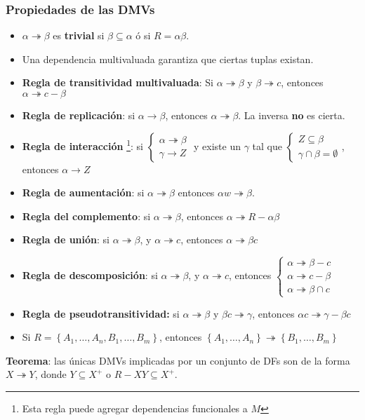 \documentclass[a4paper, twoside]{article}
\begin{document}
\subsubsection{Propiedades de las DMVs}
\begin{itemize}
\item $\alpha\twoheadrightarrow\beta$ es \textbf{trivial} si $\beta\subseteq\alpha$
ó si $R=\alpha\beta$.
\item Una dependencia multivaluada garantiza que ciertas tuplas existan.
\item \textbf{Regla de transitividad} \textbf{multivaluada}: Si $\alpha\twoheadrightarrow\beta$
y $\beta\twoheadrightarrow c$, entonces $\alpha\twoheadrightarrow c-\beta$
\item \textbf{Regla de replicación}: si $\alpha\to\beta$, entonces $\alpha\twoheadrightarrow\beta$.
La inversa \textbf{no} es cierta.
\item \textbf{Regla de interacción}%
\footnote{Esta regla puede agregar dependencias funcionales a $M$%
}: si $\begin{cases}
\alpha\twoheadrightarrow\beta\\
\gamma\to Z
\end{cases}$ y existe un $\gamma$ tal que $\begin{cases}
Z\subseteq\beta\\
\gamma\cap\beta=\emptyset
\end{cases}$, entonces $\alpha\to Z$
\item \textbf{Regla de aumentación}: si $\alpha\twoheadrightarrow\beta$
entonces $\alpha w\twoheadrightarrow\beta$.
\item \textbf{Regla del complemento}: si $\alpha\twoheadrightarrow\beta$,
entonces $\alpha\twoheadrightarrow R-\alpha\beta$
\item \textbf{Regla de unión}: si $\alpha\twoheadrightarrow\beta$, y $\alpha\twoheadrightarrow c$,
entonces $\alpha\twoheadrightarrow\beta c$
\item \textbf{Regla de descomposición}: si $\alpha\twoheadrightarrow\beta$,
y $\alpha\twoheadrightarrow c$, entonces $\begin{cases}
\alpha\twoheadrightarrow\beta-c\\
\alpha\twoheadrightarrow c-\beta\\
\alpha\twoheadrightarrow\beta\cap c
\end{cases}$
\item \textbf{Regla de pseudotransitividad:} si $\alpha\twoheadrightarrow\beta$
y $\beta c\twoheadrightarrow\gamma$, entonces $\alpha c\twoheadrightarrow\gamma-\beta c$
\item Si $R=\left\{ A_{1},\ldots,A_{n},B_{1},\ldots,B_{m}\right\} $, entonces
$\left\{ A_{1},\ldots,A_{n}\right\} \twoheadrightarrow\left\{ B_{1},\ldots,B_{m}\right\} $
\end{itemize}
\textbf{Teorema}: las únicas DMVs implicadas por un conjunto de DFs
son de la forma $X\twoheadrightarrow Y$, donde $Y\subseteq X^{+}$
o $R-XY\subseteq X^{+}$.
\end{document}
